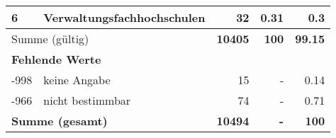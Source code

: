 \begin{longtable}{lXrrr}
     6 &
     \multicolumn{1}{X}{ Verwaltungsfachhochschulen   } &


       \num{32} &
       \num[round-mode=places,round-precision=2]{0,31} &
         \num[round-mode=places,round-precision=2]{0,3} \\
     \midrule
     \multicolumn{2}{l}{Summe (gültig)} &
       \textbf{\num{10405}} &
     \textbf{100} &
       \textbf{\num[round-mode=places,round-precision=2]{99,15}} \\
     \multicolumn{5}{l}{\textbf{Fehlende Werte}}\\
       -998 &
       keine Angabe &
         \num{15} &
        - &
         \num[round-mode=places,round-precision=2]{0,14} \\
       -966 &
       nicht bestimmbar &
         \num{74} &
        - &
         \num[round-mode=places,round-precision=2]{0,71} \\
     \midrule
     \multicolumn{2}{l}{\textbf{Summe (gesamt)}} &
          \textbf{\num{10494}} &
        \textbf{-} &
        \textbf{100} \\
     \bottomrule
     \end{longtable}
     
